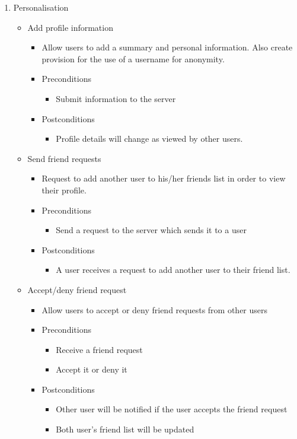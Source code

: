 \documentclass[12pt]{article}
\begin{document}
\begin{enumerate}
			\item Personalisation
			\begin{itemize}
				\item Add profile information
				\begin{itemize}
					\item Allow users to add a summary and personal information. Also create provision for the use of a username for anonymity.
					\item Preconditions
					\begin{itemize}
						\item Submit information to the server
					\end{itemize}
					\item Postconditions
					\begin{itemize}
						\item Profile details will change as viewed by other users.
					\end{itemize}
				\end{itemize}
				
				\item Send friend requests
				\begin{itemize}
					\item Request to add another user to his/her friends list in order to view their profile.
					\item Preconditions
					\begin{itemize}
						\item Send a request to the server which sends it to a user
					\end{itemize}
					\item Postconditions
					\begin{itemize}
						\item A user receives a request to add another user to their friend list.
					\end{itemize}
				\end{itemize}
				
				\item Accept/deny friend request
				\begin{itemize}
					\item Allow users to accept or deny friend requests from other users 
          
					\item Preconditions
					\begin{itemize}
						\item Receive a friend request
						\item Accept it or deny it
					\end{itemize}
					\item Postconditions
					\begin{itemize}
						\item Other user will be notified if the user accepts the friend request
						\item Both user’s friend list will be updated
					\end{itemize}
				\end{itemize}
				

\end{itemize}
\end{enumerate}
\end{document}
